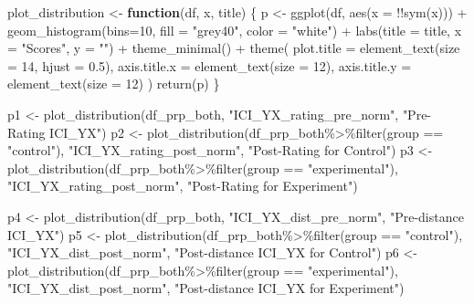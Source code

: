 \documentclass[
  letterpaper,
  DIV=11,
  numbers=noendperiod]{scrartcl}
\newenvironment{Shaded}{\begin{snugshade}}{\end{snugshade}}
\newcommand{\AttributeTok}[1]{\textcolor[rgb]{0.40,0.45,0.13}{#1}}
\newcommand{\ControlFlowTok}[1]{\textcolor[rgb]{0.00,0.23,0.31}{\textbf{#1}}}
\newcommand{\DecValTok}[1]{\textcolor[rgb]{0.68,0.00,0.00}{#1}}
\newcommand{\FloatTok}[1]{\textcolor[rgb]{0.68,0.00,0.00}{#1}}
\newcommand{\FunctionTok}[1]{\textcolor[rgb]{0.28,0.35,0.67}{#1}}
\newcommand{\NormalTok}[1]{\textcolor[rgb]{0.00,0.23,0.31}{#1}}
\newcommand{\OtherTok}[1]{\textcolor[rgb]{0.00,0.23,0.31}{#1}}
\newcommand{\SpecialCharTok}[1]{\textcolor[rgb]{0.37,0.37,0.37}{#1}}
\newcommand{\StringTok}[1]{\textcolor[rgb]{0.13,0.47,0.30}{#1}}
\begin{document}
\begin{Shaded}
\begin{Highlighting}[]
\NormalTok{plot\_distribution }\OtherTok{\textless{}{-}} \ControlFlowTok{function}\NormalTok{(df, x, title) \{}
\NormalTok{  p }\OtherTok{\textless{}{-}} \FunctionTok{ggplot}\NormalTok{(df, }\FunctionTok{aes}\NormalTok{(}\AttributeTok{x =} \SpecialCharTok{!!}\FunctionTok{sym}\NormalTok{(x))) }\SpecialCharTok{+}
  \FunctionTok{geom\_histogram}\NormalTok{(}\AttributeTok{bins=}\DecValTok{10}\NormalTok{, }\AttributeTok{fill =} \StringTok{"grey40"}\NormalTok{, }\AttributeTok{color =} \StringTok{"white"}\NormalTok{) }\SpecialCharTok{+}
  \FunctionTok{labs}\NormalTok{(}\AttributeTok{title =}\NormalTok{ title, }\AttributeTok{x =} \StringTok{"Scores"}\NormalTok{, }\AttributeTok{y =} \StringTok{""}\NormalTok{) }\SpecialCharTok{+}
  \FunctionTok{theme\_minimal}\NormalTok{() }\SpecialCharTok{+}
  \FunctionTok{theme}\NormalTok{(}
    \AttributeTok{plot.title =} \FunctionTok{element\_text}\NormalTok{(}\AttributeTok{size =} \DecValTok{14}\NormalTok{, }\AttributeTok{hjust =} \FloatTok{0.5}\NormalTok{),}
    \AttributeTok{axis.title.x =} \FunctionTok{element\_text}\NormalTok{(}\AttributeTok{size =} \DecValTok{12}\NormalTok{),}
    \AttributeTok{axis.title.y =} \FunctionTok{element\_text}\NormalTok{(}\AttributeTok{size =} \DecValTok{12}\NormalTok{)}
\NormalTok{  )}
  \FunctionTok{return}\NormalTok{(p)}
\NormalTok{\}}

\NormalTok{p1 }\OtherTok{\textless{}{-}} \FunctionTok{plot\_distribution}\NormalTok{(df\_prp\_both, }\StringTok{"ICI\_YX\_rating\_pre\_norm"}\NormalTok{, }\StringTok{"Pre{-}Rating ICI\_YX"}\NormalTok{)}
\NormalTok{p2 }\OtherTok{\textless{}{-}} \FunctionTok{plot\_distribution}\NormalTok{(df\_prp\_both}\SpecialCharTok{\%\textgreater{}\%}\FunctionTok{filter}\NormalTok{(group }\SpecialCharTok{==} \StringTok{"control"}\NormalTok{), }\StringTok{"ICI\_YX\_rating\_post\_norm"}\NormalTok{, }\StringTok{"Post{-}Rating for Control"}\NormalTok{)}
\NormalTok{p3 }\OtherTok{\textless{}{-}} \FunctionTok{plot\_distribution}\NormalTok{(df\_prp\_both}\SpecialCharTok{\%\textgreater{}\%}\FunctionTok{filter}\NormalTok{(group }\SpecialCharTok{==} \StringTok{"experimental"}\NormalTok{), }\StringTok{"ICI\_YX\_rating\_post\_norm"}\NormalTok{, }\StringTok{"Post{-}Rating for Experiment"}\NormalTok{)}

\NormalTok{p4 }\OtherTok{\textless{}{-}} \FunctionTok{plot\_distribution}\NormalTok{(df\_prp\_both, }\StringTok{"ICI\_YX\_dist\_pre\_norm"}\NormalTok{, }\StringTok{"Pre{-}distance ICI\_YX"}\NormalTok{)}
\NormalTok{p5 }\OtherTok{\textless{}{-}} \FunctionTok{plot\_distribution}\NormalTok{(df\_prp\_both}\SpecialCharTok{\%\textgreater{}\%}\FunctionTok{filter}\NormalTok{(group }\SpecialCharTok{==} \StringTok{"control"}\NormalTok{), }\StringTok{"ICI\_YX\_dist\_post\_norm"}\NormalTok{, }\StringTok{"Post{-}distance ICI\_YX for Control"}\NormalTok{)}
\NormalTok{p6 }\OtherTok{\textless{}{-}} \FunctionTok{plot\_distribution}\NormalTok{(df\_prp\_both}\SpecialCharTok{\%\textgreater{}\%}\FunctionTok{filter}\NormalTok{(group }\SpecialCharTok{==} \StringTok{"experimental"}\NormalTok{), }\StringTok{"ICI\_YX\_dist\_post\_norm"}\NormalTok{, }\StringTok{"Post{-}distance ICI\_YX for Experiment"}\NormalTok{)}


\end{Highlighting}
\end{Shaded}
\end{document}
